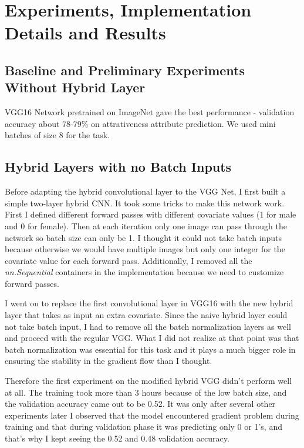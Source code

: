 \documentclass[12pt]{article}
\begin{document}
\section{Experiments, Implementation Details and Results}

\subsection{Baseline and Preliminary Experiments Without Hybrid Layer}

VGG16 Network pretrained on ImageNet gave the best performance - validation accuracy about 78-79\% on attrativeness attribute prediction. We used mini batches of size 8 for the task.

\subsection{Hybrid Layers with no Batch Inputs}
Before adapting the hybrid convolutional layer to the VGG Net, I first built a simple two-layer hybrid CNN. It took some tricks to make this network work. First I defined different forward passes with different covariate values (1 for male and 0 for female). Then at each iteration only one image can pass through the network so batch size can only be 1. I thought it could not take batch inputs because otherwise we would have multiple images but only one integer for the covariate value for each forward pass. Additionally, I removed all the \textit{nn.Sequential} containers in the implementation because we need to customize forward passes. 

I went on to replace the first convolutional layer in VGG16 with the new hybrid layer that takes as input an extra covariate. Since the naive hybrid layer could not take batch input, I had to remove all the batch normalization layers as well and proceed with the regular VGG. What I did not realize at that point was that batch normalization was essential for this task and it plays a much bigger role in ensuring the stability in the gradient flow than I thought. 

Therefore the first experiment on the modified hybrid VGG didn't perform well at all. The training took more than 3 hours because of the low batch size, and the validation accuracy came out to be 0.52. It was only after several other experiments later I observed that the model encountered gradient problem during training and that during validation phase it was predicting only 0 or 1's, and that's why I kept seeing the 0.52 and 0.48 validation accuracy.
\end{document}
